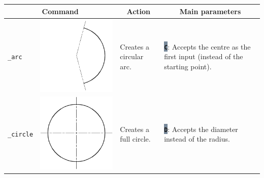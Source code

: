 \documentclass[..]{../IEEEphot}
\newcommand{\param}[1]{\colorbox{LightSlateGray}{\color{Navy}\texttt{\textbf{#1}}}}
\begin{document}
\begin{center}
\begin{longtable}{m{.1\linewidth}m{.2\linewidth}m{.3\linewidth}m{.3\linewidth}}
\toprule
    \multicolumn{2}{c}{\bfseries Command} &
    \multicolumn{1}{c}{\bfseries Action} &
    \multicolumn{1}{c}{\bfseries Main parameters} \\
\midrule
\texttt{\_arc} & \includegraphics[width = 0.8\linewidth, keepaspectratio]{../images/jpg/_arc.jpg}
& Creates a circular arc. & 
\param{C}: Accepts the centre as the first input (instead of the starting point).
\\			
\midrule
\texttt{\_circle} & \includegraphics[width = 0.8\linewidth, keepaspectratio]{../images/jpg/_circle.jpg} 
& Creates a full circle. & 
\param{D}: Accepts the diameter instead of the radius.


\end{longtable}
\end{center}
\end{document}
